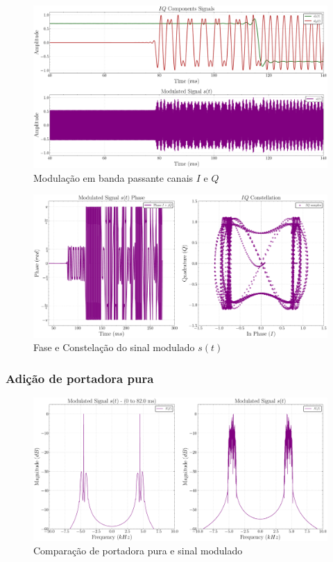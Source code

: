 \begin{figure}[H]
	\centering
	\caption{Modulação em banda passante canais $I$ e $Q$}\label{fig:transmitter_modulator_time}
	\includegraphics[width=\linewidth]{assets/cap3/transmitter_modulator_time.pdf}
\end{figure}


\begin{figure}[H]
	\centering
	\caption{Fase e Constelação do sinal modulado $s(t)$}\label{fig:transmitter_modulator_constellation}
	\includegraphics[width=\linewidth]{assets/cap3/transmitter_modulator_constellation.pdf}
\end{figure}


\subsubsection{Adição de portadora pura}

\begin{figure}[H]
	\centering
	\caption{Comparação de portadora pura e sinal modulado}\label{fig:transmitter_modulator_portadora}
	\includegraphics[width=\linewidth]{assets/cap3/transmitter_modulator_portadora.pdf}
\end{figure}


